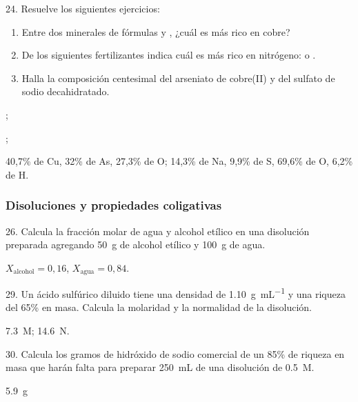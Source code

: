 \documentclass[10pt]{article}
\begin{document}
\begin{multicols}{2}
\begin{solution}
\end{solution}

\begin{exercise}
  24. Resuelve los siguientes ejercicios:
  \begin{enumerate}
    \item Entre dos minerales de fórmulas  y , ¿cuál es más rico en cobre?
    \item De los siguientes fertilizantes indica cuál es más rico en nitrógeno:  o .
    \item Halla la composición centesimal del arseniato de cobre(II)
    y del sulfato de sodio decahidratado.
  \end{enumerate}
\end{exercise}
\begin{solution}
  \begin{enumerate*}
    \item {};
    \item {};
    \item 40,7\% de Cu, 32\% de As, 27,3\% de O; 14,3\% de Na, 9,9\% de S, 69,6\% de O, 6,2\% de H.
  \end{enumerate*}
\end{solution}




\subsubsection{Disoluciones y propiedades coligativas}

\begin{exercise}
  26. Calcula la fracción molar de agua y alcohol etílico en una
  disolución preparada agregando \SI{50}{\gram} de alcohol etílico y \SI{100}{\gram} de agua.
\end{exercise}
\begin{solution}
  $X_\textrm{alcohol} = 0,16$, $X_\textrm{agua} = 0,84$.
\end{solution}

\begin{exercise}
  29. Un ácido sulfúrico diluido tiene una densidad de \SI{1.10}{\gram\per\milli\liter} y una riqueza del 65\% en masa. Calcula la molaridad y la normalidad de la disolución.
\end{exercise}
\begin{solution}
  \SI{7.3}{M}; \SI{14.6}{N}.
\end{solution}

\begin{exercise}
  30. Calcula los gramos de hidróxido de sodio comercial de un
  85\% de riqueza en masa que harán falta para preparar \SI{250}{\milli\liter} de una disolución de  \SI{0.5}{M}.
\end{exercise}
\begin{solution}
\SI{5.9}{\gram}
\end{solution}


\end{multicols}
\end{document}
